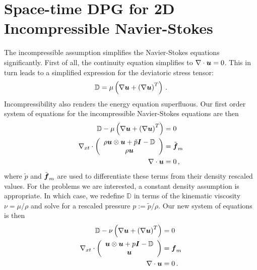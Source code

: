\documentclass[Proposal.tex]{subfiles}
\begin{document}
\section{Space-time DPG for 2D Incompressible Navier-Stokes}
The incompressible assumption simplifies the Navier-Stokes equations significantly.
First of all, the continuity equation simplifies to $\nabla\cdot\boldsymbol u=0$.
This in turn leads to a simplified expression for the deviatoric stress tensor:
\begin{equation*}
	\mathbb{D}=\mu\left( \nabla\boldsymbol u+\left( \nabla\boldsymbol u \right)^T \right)\,.
\end{equation*}
Incompressibility also renders the energy equation superfluous.
Our first order system of equations for the incompressible Navier-Stokes equations are then
\begin{align*}
	\mathbb{D}-\mu\left( \nabla\boldsymbol u+\left( \nabla\boldsymbol u \right)^T \right)&=0\\
	\nabla_{xt}\cdot\left( \begin{array}{c} \rho\boldsymbol u\otimes\boldsymbol u+\tilde p\boldsymbol I-\mathbb{D}\\ \rho\boldsymbol u\\ \end{array} \right)&=\tilde{\boldsymbol f}_m\\
	\nabla\cdot\boldsymbol u&=0\,,
\end{align*}
where $\tilde p$ and $\tilde{\boldsymbol f}_m$ are used to differentiate these terms from their density rescaled values.
For the problems we are interested, a constant density assumption is appropriate.
In which case, we redefine $\mathbb{D}$ in terms of the kinematic viscosity $\nu=\mu/\rho$ and solve for a rescaled pressure $p:=\tilde p/\rho$.
Our new system of equations is then
\begin{subequations}
\label{eq:incompressibleNSFirstOrder}
\begin{align}
	\mathbb{D}-\nu\left( \nabla\boldsymbol u+\left( \nabla\boldsymbol u \right)^T \right)&=0\\
	\nabla_{xt}\cdot\left( \begin{array}{c} \boldsymbol u\otimes\boldsymbol u+p\boldsymbol I-\mathbb{D}\\ \boldsymbol u\\ \end{array} \right)&=\boldsymbol f_m\\
	\nabla\cdot\boldsymbol u&=0\,.
\end{align}
\end{subequations}

%                                                                                           
%                                                                                           
%
\end{document}
